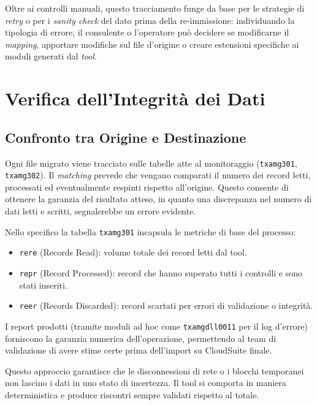 Oltre ai controlli manuali, questo tracciamento funge da base per le strategie di \textit{retry} o per
i \textit{sanity check} del dato prima della re-immissione: individuando la tipologia di errore, il consulente o l'operatore
può decidere se modificarne il \textit{mapping}, apportare modifiche sul file d'origine o creare estensioni
specifiche ai moduli generati dal \textit{tool}.

\section{Verifica dell'Integrità dei Dati}\label{sec:verifica-dell'integrita-dei-dati}

\subsection{Confronto tra Origine e Destinazione}\label{subsec:confronto-tra-origine-e-destinazione}
Ogni file migrato viene tracciato sulle tabelle atte al monitoraggio (\texttt{txamg301}, \texttt{txamg302}). Il \textit{matching}
prevede che vengano comparati il numero dei record letti, processati ed eventualmente respinti rispetto all'origine.
Questo consente di ottenere la garanzia del risultato atteso, in quanto una discrepanza nel numero di dati letti e scritti,
segnalerebbe un errore evidente.

Nello specifico la tabella \texttt{txamg301} incapsula le metriche di base del processo:
\begin{itemize}
    \item \texttt{rere} (Records Read): volume totale dei record letti dal tool.
    \item \texttt{repr} (Record Processed): record che hanno superato tutti i controlli e sono stati inseriti.
    \item \texttt{reer} (Records Discarded): record scartati per errori di validazione o integrità.
\end{itemize}

I report prodotti (tramite moduli ad hoc come \texttt{txamgdll0011} per il log d'errore) forniscono la garanzia
numerica dell'operazione, permettendo al team di validazione di avere stime certe prima dell'import su CloudSuite finale.

Questo approccio garantisce che le disconnessioni di rete o i blocchi temporanei non lascino i dati in uno stato di
incertezza.
Il tool si comporta in maniera deterministica e produce riscontri sempre validati rispetto al totale.

